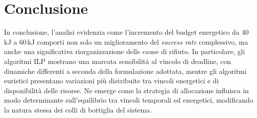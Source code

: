 \documentclass[12pt]{article}
\begin{document}
\section{Conclusione}
In conclusione, l’analisi evidenzia come l’incremento del budget energetico da 40\,kJ a 60\,kJ comporti non solo un miglioramento del \emph{success rate} complessivo, ma anche una significativa riorganizzazione delle cause di rifiuto. In particolare, gli algoritmi ILP mostrano una marcata sensibilità al vincolo di deadline, con dinamiche differenti a seconda della formulazione adottata, mentre gli algoritmi euristici presentano variazioni più distribuite tra vincoli energetici e di disponibilità delle risorse. Ne emerge come la strategia di allocazione influisca in modo determinante sull’equilibrio tra vincoli temporali ed energetici, modificando la natura stessa dei colli di bottiglia del sistema.
\end{document}
